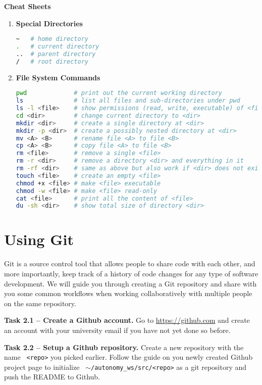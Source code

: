 \documentclass{article}
\def\code#1{\texttt{\color{magenta} #1}}
\begin{document}
{\bf Cheat Sheets}
\begin{enumerate}
\item {\bf Special Directories}
\begin{lstlisting}[language=sh]
~   # home directory
.   # current directory
..  # parent directory
/   # root directory
\end{lstlisting}

\item {\bf File System Commands}
\begin{lstlisting}[language=sh]
pwd             # print out the current working directory
ls              # list all files and sub-directories under pwd
ls -l <file>    # show permissions (read, write, executable) of <file>
cd <dir>        # change current directory to <dir>
mkdir <dir>     # create a single directory at <dir>
mkdir -p <dir>  # create a possibly nested directory at <dir>
mv <A> <B>      # rename file <A> to file <B>
cp <A> <B>      # copy file <A> to file <B>
rm <file>       # remove a single <file>
rm -r <dir>     # remove a directory <dir> and everything in it
rm -rf <dir>    # same as above but also work if <dir> does not exist
touch <file>    # create an empty <file>
chmod +x <file> # make <file> executable
chmod -w <file> # make <file> read-only
cat <file>      # print all the content of <file>
du -sh <dir>    # show total size of directory <dir>
\end{lstlisting}
\end{enumerate}

\section{Using Git}
Git is a source control tool that allows people to share code with each other, and more
importantly, keep track of a history of code changes for any type of software development.
We will guide you through creating a Git repository and share with you some common workflows
when working collaboratively with multiple people on the same repository.

{\bf Task 2.1 -- Create a Github account.} Go to \url{https://github.com} and create an
account with your university email if you have not yet done so before.

{\bf Task 2.2 -- Setup a Github repository.} Create a new repository with the
name \code{<repo>} you picked earlier. Follow the guide on you newly created Github project page
to initialize \code{$\sim$/autonomy\_ws/src/<repo>} as a git repository and push the README
to Github.
\end{document}
